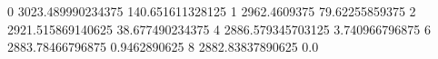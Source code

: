 0 3023.489990234375 140.651611328125
1 2962.4609375 79.62255859375
2 2921.515869140625 38.677490234375
4 2886.579345703125 3.740966796875
6 2883.78466796875 0.9462890625
8 2882.83837890625 0.0
